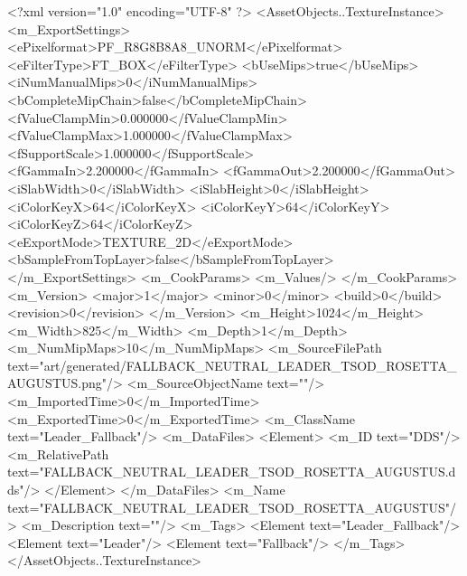 <?xml version="1.0" encoding="UTF-8" ?>
<AssetObjects..TextureInstance>
	<m_ExportSettings>
		<ePixelformat>PF_R8G8B8A8_UNORM</ePixelformat>
		<eFilterType>FT_BOX</eFilterType>
		<bUseMips>true</bUseMips>
		<iNumManualMips>0</iNumManualMips>
		<bCompleteMipChain>false</bCompleteMipChain>
		<fValueClampMin>0.000000</fValueClampMin>
		<fValueClampMax>1.000000</fValueClampMax>
		<fSupportScale>1.000000</fSupportScale>
		<fGammaIn>2.200000</fGammaIn>
		<fGammaOut>2.200000</fGammaOut>
		<iSlabWidth>0</iSlabWidth>
		<iSlabHeight>0</iSlabHeight>
		<iColorKeyX>64</iColorKeyX>
		<iColorKeyY>64</iColorKeyY>
		<iColorKeyZ>64</iColorKeyZ>
		<eExportMode>TEXTURE_2D</eExportMode>
		<bSampleFromTopLayer>false</bSampleFromTopLayer>
	</m_ExportSettings>
	<m_CookParams>
		<m_Values/>
	</m_CookParams>
	<m_Version>
		<major>1</major>
		<minor>0</minor>
		<build>0</build>
		<revision>0</revision>
	</m_Version>
	<m_Height>1024</m_Height>
	<m_Width>825</m_Width>
	<m_Depth>1</m_Depth>
	<m_NumMipMaps>10</m_NumMipMaps>
	<m_SourceFilePath text="art/generated/FALLBACK_NEUTRAL_LEADER_TSOD_ROSETTA_AUGUSTUS.png"/>
	<m_SourceObjectName text=""/>
	<m_ImportedTime>0</m_ImportedTime>
	<m_ExportedTime>0</m_ExportedTime>
	<m_ClassName text="Leader_Fallback"/>
	<m_DataFiles>
		<Element>
			<m_ID text="DDS"/>
			<m_RelativePath text="FALLBACK_NEUTRAL_LEADER_TSOD_ROSETTA_AUGUSTUS.dds"/>
		</Element>
	</m_DataFiles>
	<m_Name text="FALLBACK_NEUTRAL_LEADER_TSOD_ROSETTA_AUGUSTUS"/>
	<m_Description text=""/>
	<m_Tags>
		<Element text="Leader_Fallback"/>
		<Element text="Leader"/>
		<Element text="Fallback"/>
	</m_Tags>
</AssetObjects..TextureInstance>

